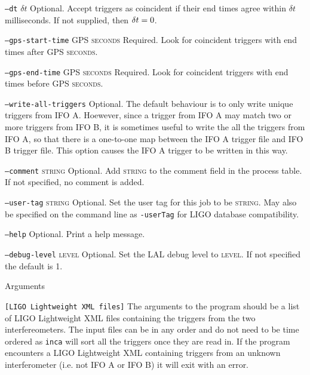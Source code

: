 \begin{entry}
\begin{entry}
\item[\texttt{--dt} \textsc{$\delta t$}] Optional. Accept triggers as
coincident if their end times agree within $\delta t$ milliseconds.  If not
supplied,  then $\textsc{$\delta t$} = 0$.

\item[\texttt{--gps-start-time} \textsc{GPS seconds}] Required.  Look for
coincident triggers with end times after \textsc{GPS seconds}.

\item[\texttt{--gps-end-time} \textsc{GPS seconds}] Required.  Look for
coincident triggers with end times before \textsc{GPS seconds}.


\item[\texttt{--write-all-triggers}] Optional.  The default behaviour is to
only write unique triggers from IFO A. Hoewever, since a trigger from IFO A
may match two or more triggers from IFO B, it is sometimes useful to write
the all the triggers from IFO A, so that there is a one-to-one map between the
IFO A trigger file and IFO B trigger file. This option causes the IFO A
trigger to be written in this way.

\item[\texttt{--comment} \textsc{string}] Optional. Add \textsc{string} to the
comment field in the process table. If not specified, no comment is added. 

\item[\texttt{--user-tag} \textsc{string}] Optional. Set the user tag for this
job to be \textsc{string}. May also be specified on the command line as 
\texttt{-userTag} for LIGO database compatibility.

\item[\texttt{--help}] Optional.  Print a help message.
\end{entry}

\item[\texttt{--debug-level} \textsc{level}] Optional. Set the LAL debug
level to \textsc{level}. If not specified the default is 1.

\item[Arguments]\leavevmode
\begin{entry}
\item[\texttt{[LIGO Lightweight XML files]}] The arguments to the program
should be a list of LIGO Lightweight XML files containing the triggers from
the two interfereometers. The input files can be in any order and do not need
to be time ordered as \texttt{inca} will sort all the triggers once they are
read in. If the program encounters a LIGO Lightweight XML containing triggers
from an unknown interferometer (i.e. not IFO A or IFO B) it will exit with an
error.
\end{entry}


\end{entry}
